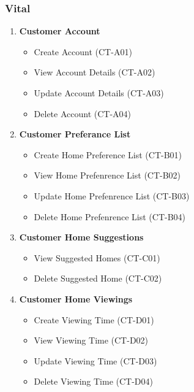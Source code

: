 \documentclass[11pt]{article}
\begin{document}
			\subsubsection{Vital}
				\begin{enumerate}[i]
					\item \textbf{Customer Account}
					\begin{itemize}
						\item Create Account (CT-A01)
						\item View Account Details (CT-A02)
						\item Update Account Details (CT-A03)
						\item Delete Account (CT-A04)
					\end{itemize}
					
					\item \textbf{Customer Preferance List}
					\begin{itemize}
						\item Create Home Preference List (CT-B01)
						\item View Home Prefenrence List (CT-B02)
						\item Update Home Prefenrence List (CT-B03)
						\item Delete Home Prefenrence List (CT-B04)
					\end{itemize}
					
					\item \textbf{Customer Home Suggestions}
					\begin{itemize}
						\item View Suggested Homes (CT-C01)
						\item Delete Suggested Home (CT-C02)
					\end{itemize}
					
					\item \textbf{Customer Home Viewings}
					\begin{itemize}
						\item Create Viewing Time (CT-D01)
						\item View Viewing Time (CT-D02)
						\item Update Viewing Time (CT-D03)
						\item Delete Viewing Time (CT-D04)
					\end{itemize}
				\end{enumerate}
	
\end{document}
